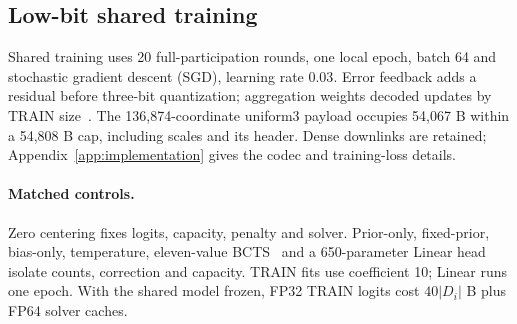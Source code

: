 \subsection{Low-bit shared training}
Shared training uses 20 full-participation rounds, one local epoch, batch 64 and stochastic gradient descent (SGD), learning rate $0.03$. Error feedback adds a residual before three-bit quantization; aggregation weights decoded updates by TRAIN size~\cite{karimireddy2019errorfeedback}. The 136,874-coordinate uniform3 payload occupies 54,067 B within a 54,808 B cap, including scales and its header. Dense downlinks are retained; Appendix~\ref{app:implementation} gives the codec and training-loss details.

\paragraph{Matched controls.}
Zero centering fixes logits, capacity, penalty and solver. Prior-only, fixed-prior, bias-only, temperature, eleven-value BCTS~\cite{guo2017calibration,alexandari2020labelshift} and a 650-parameter Linear head isolate counts, correction and capacity. TRAIN fits use coefficient 10; Linear runs one epoch. With the shared model frozen, FP32 TRAIN logits cost $40|D_i|$ B plus FP64 solver caches.